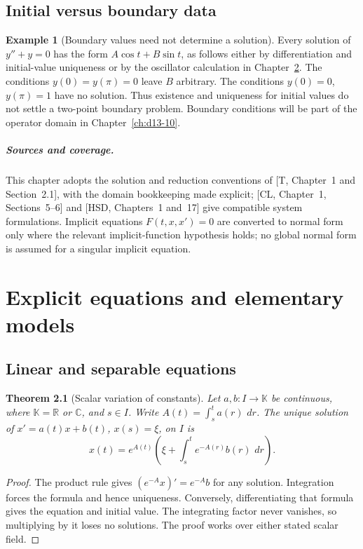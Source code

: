 \documentclass[11pt,oneside]{book}
\newtheorem{theorem}{Theorem}[chapter]
\theoremstyle{definition}
\newtheorem{example}[theorem]{Example}
\theoremstyle{remark}\newtheorem{remark}[theorem]{Remark}
\newcommand{\R}{\mathbb R}\newcommand{\C}{\mathbb C}
\newcommand{\dd}{\,d}\newcommand{\id}{\operatorname{id}}
\begin{document}
\section{Initial versus boundary data}
\begin{example}[Boundary values need not determine a solution]\label{d13:01:boundary-example}
Every solution of $y''+y=0$ has the form $A\cos t+B\sin t$, as follows
either by differentiation and initial-value uniqueness or by the
oscillator calculation in Chapter~\ref{ch:d13-02}. The conditions
$y(0)=y(\pi)=0$ leave $B$ arbitrary. The conditions $y(0)=0$,
$y(\pi)=1$ have no solution. Thus existence and uniqueness for initial
values do not settle a two-point boundary problem. Boundary conditions
will be part of the operator domain in Chapter~\ref{ch:d13-10}.
\end{example}

\paragraph{Sources and coverage.}
This chapter adopts the solution and reduction conventions of [T,
Chapter~1 and Section~2.1], with the domain bookkeeping made explicit;
[CL, Chapter~1, Sections~5--6] and [HSD, Chapters~1 and~17] give compatible
system formulations. Implicit equations $F(t,x,x')=0$ are converted to
normal form only where the relevant implicit-function hypothesis holds;
no global normal form is assumed for a singular implicit equation.



\chapter{Explicit equations and elementary models}\label{ch:d13-02}

\section{Linear and separable equations}
\begin{theorem}[Scalar variation of constants]\label{d13:02:linear}
Let $a,b:I\to\mathbb K$ be continuous, where $\mathbb K=\R$ or $\C$,
and $s\in I$. Write $A(t)=\int_s^t a(r)\,\dd r$. The unique solution
of $x'=a(t)x+b(t)$, $x(s)=\xi$, on $I$ is
\[
 x(t)=e^{A(t)}\left(\xi+\int_s^t e^{-A(r)}b(r)\,\dd r\right).
\]
\end{theorem}
\begin{proof}
The product rule gives $(e^{-A}x)'=e^{-A}b$ for any solution.
Integration forces the formula and hence uniqueness. Conversely,
differentiating that formula gives the equation and initial value.
The integrating factor never vanishes, so multiplying by it loses no
solutions. The proof works over either stated scalar field.
\end{proof}
\end{document}
